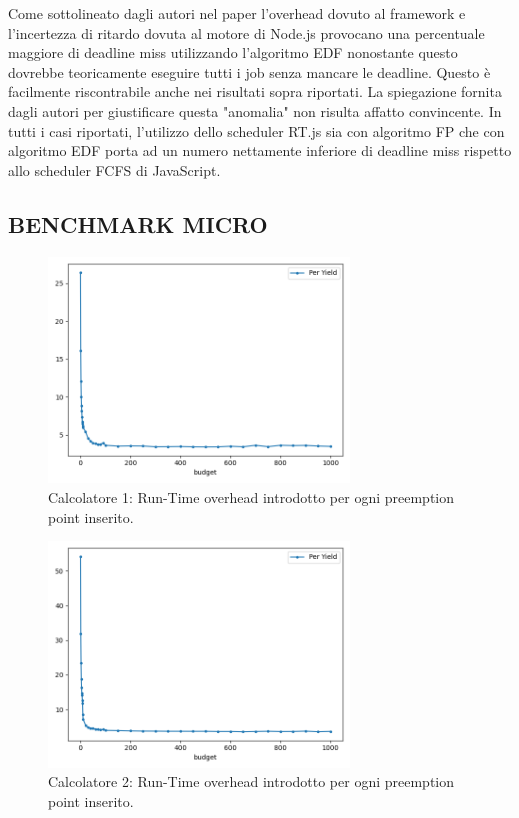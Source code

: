 \documentclass[conference]{IEEEtran}
\begin{document}
    \newline
    Come sottolineato dagli autori nel paper l'overhead dovuto al framework e l'incertezza di ritardo dovuta al motore di Node.js provocano una percentuale maggiore di deadline miss utilizzando l'algoritmo EDF nonostante questo dovrebbe teoricamente eseguire tutti i job senza mancare le deadline. Questo è facilmente riscontrabile anche nei risultati sopra riportati. La spiegazione fornita dagli autori per giustificare questa "anomalia" non risulta affatto convincente.
    \newline
    In tutti i casi riportati, l'utilizzo dello scheduler RT.js sia con algoritmo FP che con algoritmo EDF porta ad un numero nettamente inferiore di deadline miss rispetto allo scheduler FCFS di JavaScript.
    \subsection{BENCHMARK MICRO}
    \begin{figure}[hbt!]
    \includegraphics[width=8cm]{micro_1.1.png}
    \centering
    \caption{Calcolatore 1: Run-Time overhead introdotto per ogni preemption point inserito.}
    \end{figure}
    \begin{figure}[hbt!]
    \includegraphics[width=8cm]{micro_2.1.png}
    \centering
    \caption{Calcolatore 2: Run-Time overhead introdotto per ogni preemption point inserito.}
    \end{figure}
\end{document}
